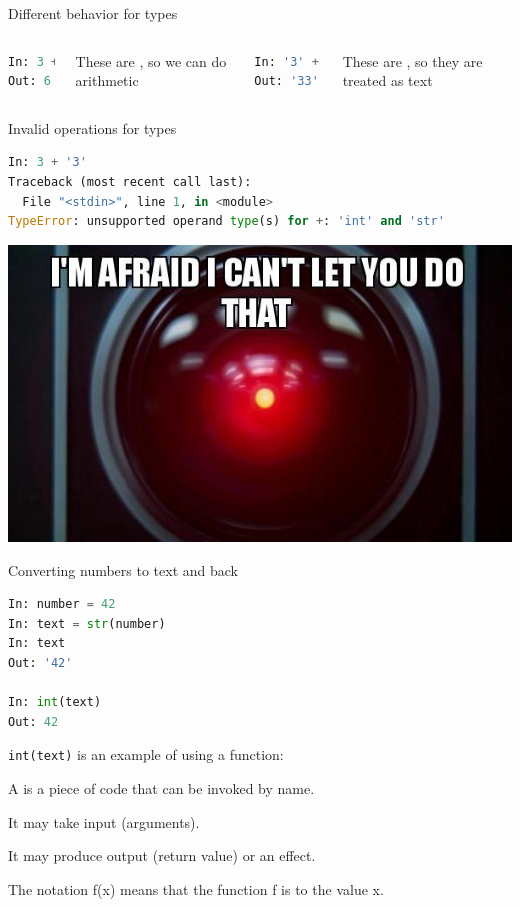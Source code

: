\documentclass[aspectratio=169,usenames,dvipsnames]{beamer}
\begin{document}
\begin{frame}[fragile]{Different behavior for types}
    \begin{columns}
\begin{lstlisting}[language=python]
In: 3 + 3
Out: 6
\end{lstlisting}

These are , so we can do arithmetic
\begin{lstlisting}[language=python]
In: '3' + '3'
Out: '33'
\end{lstlisting}

These are , so they are treated as text
    \end{columns}
\end{frame}

\begin{frame}[fragile]{Invalid operations for types}
\begin{lstlisting}[language=python]
In: 3 + '3'
Traceback (most recent call last):
  File "<stdin>", line 1, in <module>
TypeError: unsupported operand type(s) for +: 'int' and 'str'
\end{lstlisting}
    
    \centering
    \includegraphics[height=0.5\textheight]{fig/cantdothat}
\end{frame}
    

\begin{frame}[fragile]{Converting numbers to text and back}
\begin{lstlisting}[language=python]
In: number = 42
In: text = str(number)
In: text
Out: '42'

In: int(text)
Out: 42
\end{lstlisting}

    \texttt{int(text)} is an example of using a function:

    \begin{definition}
        A  is a piece of code
        that can be invoked by name.

        It may take input (arguments).
        
        It may produce output (return value) or an effect.

        The notation f(x) means that the function f
        is  to the value x.
    \end{definition}

\end{frame}
\end{document}
